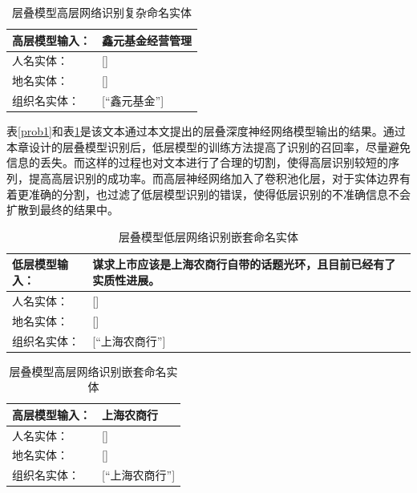 \documentclass[winfonts,master,oneside,nobackinfo]{njuthesis}
\begin{document}
\begin{table}[h]
\centering
\begin{tabularx}{0.95\textwidth}{|l|X|}
\hline
高层模型输入： & 鑫元基金经营管理 \\ \hline
人名实体：             & {[}{]}                                                           \\ \hline
地名实体：             & {[}{]}                                                           \\ \hline
组织名实体：            & {[}“鑫元基金”{]}                   \\ \hline
\end{tabularx}
\caption{层叠模型高层网络识别复杂命名实体}
\label{prob2}
\end{table}


表\ref{prob1}和表\ref{prob2}是该文本通过本文提出的层叠深度神经网络模型输出的结果。通过本章设计的层叠模型识别后，低层模型的训练方法提高了识别的召回率，尽量避免信息的丢失。而这样的过程也对文本进行了合理的切割，使得高层识别较短的序列，提高高层识别的成功率。而高层神经网络加入了卷积池化层，对于实体边界有着更准确的分割，也过滤了低层模型识别的错误，使得低层识别的不准确信息不会扩散到最终的结果中。

\begin{table}[h]
\centering
\begin{tabularx}{0.95\textwidth}{|l|X|}
\hline
低层模型输入： & 谋求上市应该是上海农商行自带的话题光环，且目前已经有了实质性进展。 \\ \hline
人名实体：             & {[}{]}                                                           \\ \hline
地名实体：             & {[}{]}                                                           \\ \hline
组织名实体：            & {[}“上海农商行”{]}                  \\ \hline
\end{tabularx}
\caption{层叠模型低层网络识别嵌套命名实体}
\label{solve-cascade1}
\end{table}

\begin{table}[h]
\centering
\begin{tabularx}{0.95\textwidth}{|l|X|}
\hline
高层模型输入： & 上海农商行 \\ \hline
人名实体：             & {[}{]}                                                           \\ \hline
地名实体：             & {[}{]}                                                           \\ \hline
组织名实体：            & {[}“上海农商行”{]}                   \\ \hline
\end{tabularx}
\caption{层叠模型高层网络识别嵌套命名实体}
\label{solve-cascade2}
\end{table}
\end{document}
